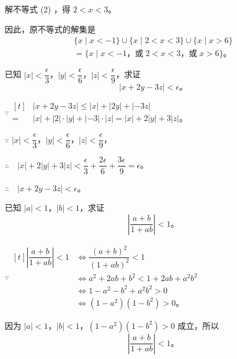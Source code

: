 解不等式 (2) ，得 $2 < x < 3$。

因此，原不等式的解集是
\begin{gather*}
    \{ x \mid x < -1 \} \cup \{ x \mid 2 < x < 3 \} \cup \{ x \mid x > 6 \} \\
    = \{ x \mid x < -1 \text{，或}\; 2 < x < 3 \text{，或}\; x > 6 \} \text{。}
\end{gather*}


\liti 已知 $|x| < \dfrac{\epsilon}{3}$，$|y| < \dfrac{\epsilon}{6}$，$|z| < \dfrac{\epsilon}{9}$，求证
$$ |x + 2y - 3z| < \epsilon \text{。} $$

\zhengming \; $\because \begin{aligned}[t]
        & |x + 2y - 3z| \leqslant |x| + |2y| + |-3z| \\
    ={} & |x| + |2| \cdot |y| + |-3| \cdot |z| = |x| + 2|y| + 3|z| \text{。}
\end{aligned}$

$\because$ \quad $|x| < \dfrac{\epsilon}{3}$，$|y| < \dfrac{\epsilon}{6}$，$|z| < \dfrac{\epsilon}{9}$，

$\therefore \quad |x| + 2|y| + 3|z| < \dfrac{\epsilon}{3} + \dfrac{2\epsilon}{6} + \dfrac{3\epsilon}{9} = \epsilon$。

$\therefore \quad |x + 2y - 3z| < \epsilon$。


\liti 已知 $|a| < 1$，$|b| < 1$，求证
$$ \left| \dfrac{a + b}{1 + ab} \right| < 1 \text{。} $$

\zhengming \; $\because \begin{aligned}[t]
    \left| \dfrac{a + b}{1 + ab} \right| < 1 & \iff \dfrac{(a + b)^2}{(1 + ab)^2} < 1 \\
    & \iff a^2 + 2ab + b^2 < 1 + 2ab + a^2b^2 \\
    & \iff 1 - a^2 - b^2 + a^2b^2 > 0 \\
    & \iff (1 - a^2)(1 - b^2) > 0 \text{。}
\end{aligned}$

因为 $|a| < 1$，$|b| < 1$，$(1 - a^2)(1 - b^2) > 0$ 成立，所以
$$ \left| \dfrac{a + b}{1 + ab} \right| < 1 \text{。} $$


